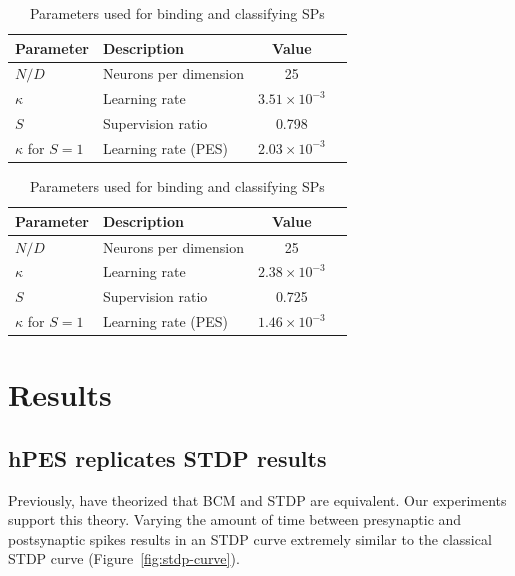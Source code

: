\documentclass[10pt,letterpaper]{article}
\begin{document}
\begin{table}[!ht]
\begin{center} 
\caption{Parameters used for transmitting semantic pointers}
\vspace{0.2ex}
\label{tab:params-1} 
\begin{tabular}{llcc} 
\hline
Parameter & Description & Value \\
\hline
$N / D$ & Neurons per dimension & 25 \\
$\kappa$ & Learning rate & $3.51 \times 10^{-3}$ \\
$S$ & Supervision ratio & 0.798 \\
$\kappa$ for $S = 1$ & Learning rate (PES) & $2.03 \times 10^{-3}$\\ 
\hline
\end{tabular} 
\end{center}
\begin{center} 
\caption{Parameters used for binding and classifying SPs}
\vspace{0.2ex}
\label{tab:params-2} 
\begin{tabular}{llcc} 
\hline
Parameter & Description & Value \\
\hline
$N / D$ & Neurons per dimension & 25 \\
$\kappa$ & Learning rate & $2.38 \times 10^{-3}$ \\
$S$ & Supervision ratio & 0.725 \\
$\kappa$ for $S = 1$ & Learning rate (PES) & $1.46 \times 10^{-3}$ \\ 
\hline
\end{tabular} 
\end{center}
\end{table}

\section{Results}

\subsection{hPES replicates STDP results}

Previously, 
have theorized that BCM and STDP are equivalent.
Our experiments support this theory.
Varying the amount of time between presynaptic
and postsynaptic spikes results in an STDP curve
extremely similar to the classical
 STDP curve
(Figure~\ref{fig:stdp-curve}).
\end{document}
